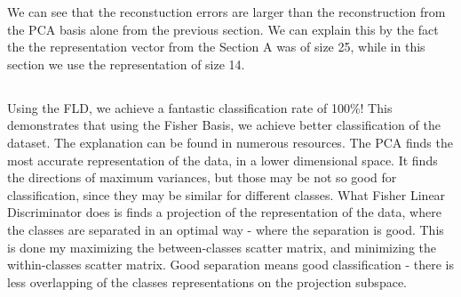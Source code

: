 \documentclass[a4paper]{iacas}
\begin{document}
We can see that the reconstuction errors are larger than the reconstruction from the PCA basis alone from the previous section. We can explain this by the fact the the representation vector from the Section A was of size 25, while in this section we use the representation of size 14.

 \subsection{}
Using the FLD, we achieve a fantastic classification rate of 100\%! This demonstrates that using the Fisher Basis, we achieve better classification of the dataset. The explanation can be found in numerous resources.
\newline
The PCA finds the most accurate representation of the data, in a lower dimensional space. It finds the directions of maximum variances, but those may be not so good for classification, since they may be similar for different classes. What Fisher Linear Discriminator does is finds a projection of the representation of the data, where the classes are separated in an optimal way - where the separation is good. This is done my maximizing the between-classes scatter matrix, and minimizing the within-classes scatter matrix.  Good separation means good classification - there is less overlapping of the classes representations on the projection subspace.
\end{document}
